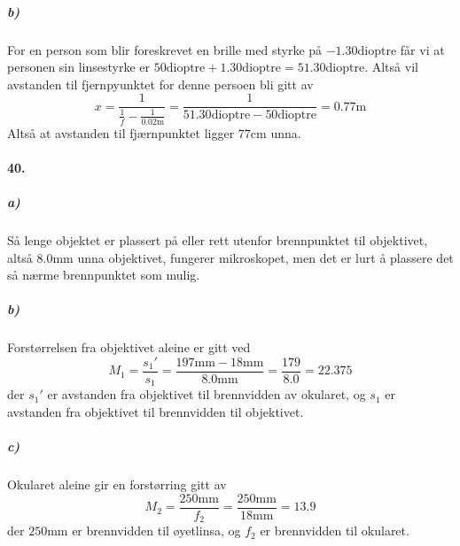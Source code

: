\documentclass[11pt, A4paper,norsk]{article}
\begin{document}
			\subparagraph{b)}
				\begin{flushleft}
For en person som blir foreskrevet en brille med styrke på $-1.30 \text{dioptre}$ får vi at personen sin linsestyrke er $50 \text{dioptre} + 1.30 \text{dioptre} = 51.30 \text{dioptre}$. Altså vil avstanden til fjernpyunktet for denne persoen bli gitt av
$$x = \frac{1}{\frac{1}{f} - \frac{1}{0.02 \text{m}}} = \frac{1}{51.30 \text{dioptre} - 50 \text{dioptre}} = 0.77 \text{m}$$
Altså at avstanden til fjærnpunktet ligger $77 \text{cm}$ unna.
				\end{flushleft}









		\paragraph{40.}
			\subparagraph{a)}
				\begin{flushleft}
Så lenge objektet er plassert på eller rett utenfor brennpunktet til objektivet, altså $8.0 \text{mm}$ unna objektivet, fungerer mikroskopet, men det er lurt å plassere det så nærme brennpunktet som mulig.
				\end{flushleft}












			\subparagraph{b)}
				\begin{flushleft}
Forstørrelsen fra objektivet aleine er gitt ved
$$M_1 = \frac{s_1'}{s_1} = \frac{197 \text{mm} - 18 \text{mm}}{8.0 \text{mm}} = \frac{179}{8.0} = 22.375$$
der $s_1'$ er avstanden fra objektivet til brennvidden av okularet, og $s_1$ er avstanden fra objektivet til brennvidden til objektivet.
				\end{flushleft}












			\subparagraph{c)}
				\begin{flushleft}
Okularet aleine gir en forstørring gitt av
$$M_2 = \frac{250 \text{mm}}{f_2} = \frac{250 \text{mm}}{18 \text{mm}} = 13.9$$
der $250 \text{mm}$ er brennvidden til øyetlinsa, og $f_2$ er brennvidden til okularet.
				\end{flushleft}
\end{document}
